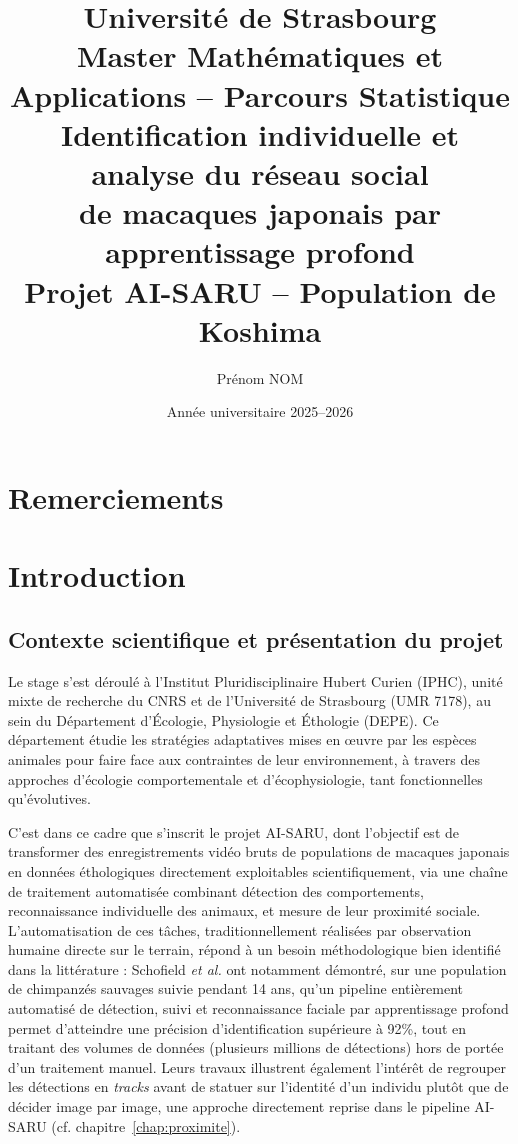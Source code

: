 \documentclass[11pt,a4paper]{report}
\title{
    \Large Université de Strasbourg \\
    \large Master Mathématiques et Applications -- Parcours Statistique \\
    \vspace{1cm}
    \Huge \textbf{Identification individuelle et analyse du réseau social \\ de macaques japonais par apprentissage profond} \\
    \vspace{0.3cm}
    \large Projet AI-SARU -- Population de Koshima
}
\author{Prénom NOM}
\date{Année universitaire 2025--2026}
\begin{document}
\maketitle
\thispagestyle{empty}

\chapter*{Remerciements}
\thispagestyle{empty}

\newpage

\tableofcontents
\thispagestyle{empty}

\newpage


\chapter*{Introduction}

\section*{Contexte scientifique et présentation du projet}

Le stage s'est déroulé à l'Institut Pluridisciplinaire Hubert Curien (IPHC), unité
mixte de recherche du CNRS et de l'Université de Strasbourg (UMR 7178), au sein du
Département d'Écologie, Physiologie et Éthologie (DEPE). Ce département étudie les
stratégies adaptatives mises en \oe uvre par les espèces animales pour faire face aux
contraintes de leur environnement, à travers des approches d'écologie comportementale
et d'écophysiologie, tant fonctionnelles qu'évolutives.

C'est dans ce cadre que s'inscrit le projet AI-SARU, dont l'objectif est de
transformer des enregistrements vidéo bruts de populations de macaques japonais en
données éthologiques directement exploitables scientifiquement, via une chaîne de
traitement automatisée combinant détection des comportements, reconnaissance
individuelle des animaux, et mesure de leur proximité sociale. L'automatisation de
ces tâches, traditionnellement réalisées par observation humaine directe sur le
terrain, répond à un besoin méthodologique bien identifié dans la littérature :
Schofield \emph{et al.} \citep{schofield2019} ont notamment démontré, sur une
population de chimpanzés sauvages suivie pendant 14 ans, qu'un pipeline entièrement
automatisé de détection, suivi et reconnaissance faciale par apprentissage profond
permet d'atteindre une précision d'identification supérieure à 92\%, tout en
traitant des volumes de données (plusieurs millions de détections) hors de portée
d'un traitement manuel. Leurs travaux illustrent également l'intérêt de regrouper
les détections en \emph{tracks} avant de statuer sur l'identité d'un individu plutôt
que de décider image par image, une approche directement reprise dans le pipeline
AI-SARU (cf. chapitre~\ref{chap:proximite}).
\end{document}
